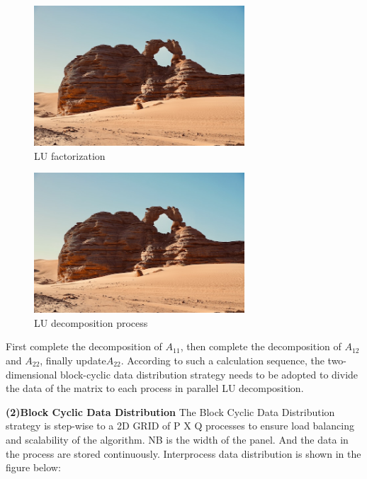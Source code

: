 \documentclass[a4paper,12pt]{article}
\begin{document}
\begin{figure}[H]
    \centering
    \includegraphics[width=0.7\textwidth]{LU_factorization.png}
    \caption{LU factorization}
    \label{fig:lu_factorization}
\end{figure}

\begin{figure}[H]
    \centering
    \includegraphics[width=0.7\textwidth]{LU_decomposition_process.png}
    \caption{LU decomposition process}
    \label{fig:lu_decomposition}
\end{figure}

First complete the decomposition of $A_{11}$, then complete the decomposition of $A_{12}$and $A_{22}$, finally update$A_{22}$. According to such a calculation sequence, the two-dimensional block-cyclic data distribution strategy needs to be adopted to divide the data of the matrix to each process in parallel LU decomposition.

\textbf{(2)Block Cyclic Data Distribution}
The Block Cyclic Data Distribution strategy is step-wise to a 2D GRID of P X Q processes to ensure load balancing and scalability of the algorithm. NB is the width of the panel. And the data in the process are stored continuously. Interprocess data distribution is shown in the figure below:
\end{document}
